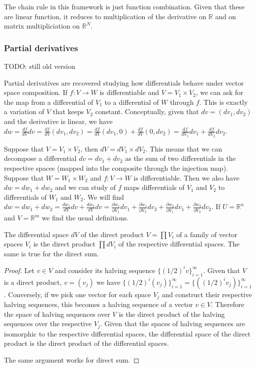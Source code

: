 \documentclass[11pt,letterpaper,fleqn]{memoir}
\begin{document}
\begin{remark}
	The chain rule in this framework is just function combination. Given that these are linear function, it reduces to multiplication of the derivative on $\mathbb{R}$ and on matrix multipliciation on $\mathbb{R}^N$.
\end{remark}


\subsubsection{Partial derivatives}

TODO: still old version

Partial derivatives are recovered studying how differentials behave under vector space composition. If $f : V \to W$ is differentiable and $V = V_1 \times V_2$, we can ask for the map from a differential of $V_1$ to a differential of $W$ through $f$. This is exactly a variation of $V$ that keeps $V_2$ constant. Conceptually, given that $dv = (dv_1, dv_2)$ and the derivative is linear, we have $dw = \frac{df}{dV} dv = \frac{df}{dV} (dv_1, dv_2) = \frac{df}{dV} (dv_1, 0) + \frac{df}{dV} (0, dv_2) = \frac{df}{dV_1} dv_1 + \frac{df}{dV_2} dv_2$.
	
Suppose that $V = V_1 \times V_2$, then $dV = dV_1 \times dV_2$. This means that we can decompose a differential $dv= dv_1 + dv_2$ as the sum of two differentials in the respective spaces (mapped into the composite through the injection map). Suppose that $W = W_1 \times W_2$ and $f : V \to W$ is differentiable. Then we also have $dw= dw_1 + dw_2$ and we can study of $f$ maps differentials of $V_1$ and $V_2$ to differentials of $W_1$ and $W_2$. We will find $dw = dw_1 + dw_2 = \frac{dw_1}{dV} dv + \frac{dw_2}{dV} dv = \frac{\partial w_1}{\partial V_1} dv_1 + \frac{\partial w_1}{\partial V_2} dv_2 + \frac{\partial w_2}{\partial V_1} dv_1 + \frac{\partial w_2}{\partial V_2} dv_2$. If $U = \mathbb{R}^n$ and $V = \mathbb{R}^m$ we find the usual definitions.

\begin{prop}
	The differential space $dV$ of the direct product $V=\prod V_i$ of a family of vector spaces $V_i$ is the direct product $\prod dV_i$ of the respective differential spaces. The same is true for the direct sum.
\end{prop}

\begin{proof}
	Let $v \in V$ and consider its halving sequence $\{(1/2)^i v\}_{i=1}^{\infty}$. Given that $V$ is a direct product, $v=(v_j)$ we have $\{(1/2)^i (v_j)\}_{i=1}^{\infty} = \{((1/2)^i v_j)\}_{i=1}^{\infty}$. Conversely, if we pick one vector for each space $V_j$ and construct their respective halving sequences, this becomes a halving sequence of a vector $v \in V$. Therefore the space of halving sequences over $V$ is the direct product of the halving sequences over the respective $V_j$. Given that the spaces of halving sequences are isomorphic to the respective differential spaces, the differential space of the direct product is the direct product of the differential spaces.
	
	The same argument works for direct sum.
\end{proof}
\end{document}
